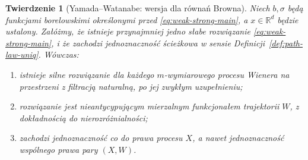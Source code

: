\documentclass[11pt,a4paper,oneside]{report}
\numberwithin{equation}{chapter}
\theoremstyle{plain}
\newtheorem{twierdzenie}{Twierdzenie}[chapter]
\theoremstyle{definition}
\theoremstyle{remark}
\newcommand{\R}{\mathbb{R}}
\begin{document}
\begin{twierdzenie}[Yamada--Watanabe: wersja dla równań Browna]
\label{th:YW}
Niech $b,\sigma$ będą funkcjami borelowskimi określonymi
przed \eqref{eq:weak-strong-main}, a $x\in\R^d$ będzie
ustalony. Załóżmy, że istnieje przynajmniej jedno słabe
rozwiązanie \eqref{eq:weak-strong-main}, i że zachodzi
jednoznaczność ścieżkowa w sensie
Definicji~\ref{def:path-law-uniq}. Wówczas:
\begin{enumerate}
\item istnieje silne rozwiązanie dla każdego $m$-wymiarowego
procesu Wienera na przestrzeni z filtracją naturalną,
po jej zwykłym uzupełnieniu;
\item rozwiązanie jest nieantycypującym mierzalnym funkcjonałem
trajektorii $W$, z dokładnością do nierozróżnialności;
\item zachodzi jednoznaczność co do prawa procesu $X$,
a nawet jednoznaczność wspólnego prawa pary $(X,W)$.
\end{enumerate}
\end{twierdzenie}
\end{document}
